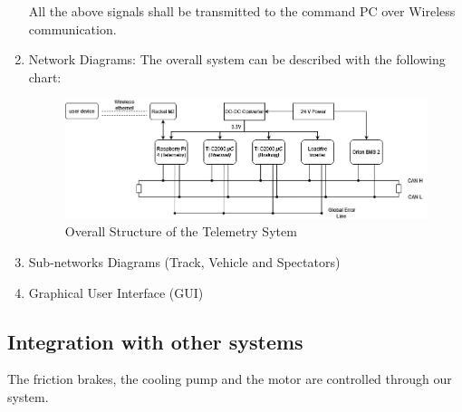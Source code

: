 \begin{enumerate}
All the above signals shall be transmitted to the command PC over Wireless communication.

    \item Network Diagrams:
The overall system can be described with the following chart:
\begin{figure}
    \centering
    \includegraphics[width=\textwidth]{texfiles/elec/eimg/telemetrysystems.png}
    \caption{Overall Structure of the Telemetry Sytem}
    \label{fig:enter-label}
\end{figure}
    \item Sub-networks Diagrams (Track, Vehicle and Spectators)

    \item Graphical User Interface (GUI)
\end{enumerate}


\subsection{Integration with other systems}
The friction brakes, the cooling pump and the motor are controlled through our system.



